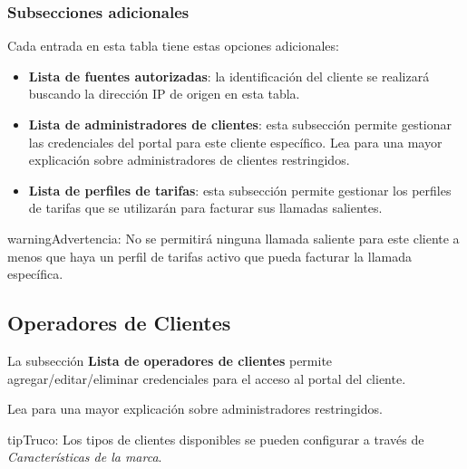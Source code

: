 \documentclass[letterpaper,10pt,spanish]{sphinxmanual}
\begin{document}
\subsubsection{Subsecciones adicionales}
\label{administration_portal/brand/clients/wholesale:additional-subsections}
Cada entrada en esta tabla tiene estas opciones adicionales:
\begin{itemize}
\item {} 
\textbf{Lista de fuentes autorizadas}: la identificación del cliente se realizará buscando la dirección IP de origen en esta tabla.

\item {} 
\textbf{Lista de administradores de clientes}: esta subsección permite gestionar las credenciales del portal para este cliente específico. Lea {\hyperref[api_rest/acls:acls]{}} para una mayor explicación sobre administradores de clientes restringidos.

\item {} 
\textbf{Lista de perfiles de tarifas}: esta subsección permite gestionar los perfiles de tarifas que se utilizarán para facturar sus llamadas salientes.

\end{itemize}

\begin{notice}{warning}{Advertencia:}
No se permitirá ninguna llamada saliente para este cliente a menos que haya un perfil de tarifas activo que pueda facturar la llamada específica.
\end{notice}


\subsection{Operadores de Clientes}
\label{administration_portal/brand/clients/operators::doc}\label{administration_portal/brand/clients/operators:client-operators}\label{administration_portal/brand/clients/operators:id1}
La subsección \textbf{Lista de operadores de clientes} permite agregar/editar/eliminar credenciales para el acceso al portal del cliente.

Lea {\hyperref[api_rest/acls:acls]{}} para una mayor explicación sobre administradores restringidos.

\begin{notice}{tip}{Truco:}
Los tipos de clientes disponibles se pueden configurar a través de \emph{Características de la marca}.
\end{notice}
\end{document}
